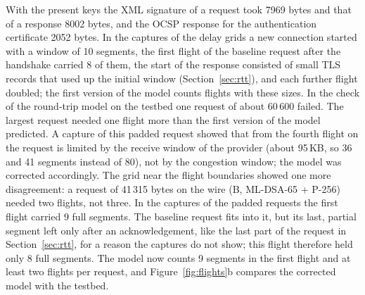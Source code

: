 \documentclass[conference,a4paper]{IEEEtran}
\newcommand{\newtext}[1]{{\color{blue}#1}}
\begin{document}
{\newtext{With the present keys the XML signature of a request took 7969 bytes and that of a response
8002 bytes, and the OCSP response for the authentication certificate 2052 bytes. In the captures of
the delay grids a new connection started with a window of 10 segments,
the first flight of the \newtext{baseline} request after the handshake carried \newtext{8} of them, the start of the response
consisted of small TLS records that used up the initial window (Section~\ref{sec:rtt}), and each
further flight doubled; the \newtext{first version of the} model counts flights with these sizes. In the check of the round-trip
model on the testbed one request of about \newtext{60\,600} failed. The largest
request needed one flight more than the first version of the model predicted. A capture \newtext{of
this padded request} showed that
from the fourth flight on the request is limited by the receive window of the provider (about
95\,KB, so 36 and 41 segments instead of 80), not by the congestion window; the model was corrected
accordingly\newtext{. The grid near the flight boundaries showed one more disagreement: a request of
41\,315 bytes on the wire (B, ML-DSA-65 + P-256) needed two flights, not three. \newtext{In the
captures of the padded requests the first flight carried 9 full segments. The baseline request fits
into it, but its last, partial segment left only after an acknowledgement, like the last part of
the request in Section~\ref{sec:rtt}, for a reason the captures do not show; this flight therefore held only 8 full
segments.} The model now counts 9 segments in the
first flight and at least two flights per request}, and \newtext{Figure~\ref{fig:flights}b}
compares the corrected model with the testbed.}

}
\end{document}
